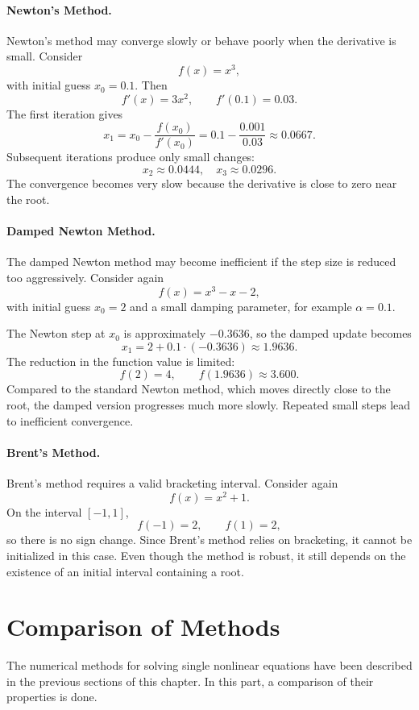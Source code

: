 \paragraph{Newton's Method.}
Newton's method may converge slowly or behave poorly when the derivative is small. Consider
\[
f(x) = x^3,
\]
with initial guess \(x_0 = 0.1\). Then
\[
f'(x) = 3x^2, \qquad f'(0.1) = 0.03.
\]
The first iteration gives
\[
x_1 = x_0 - \frac{f(x_0)}{f'(x_0)} = 0.1 - \frac{0.001}{0.03} \approx 0.0667.
\]
Subsequent iterations produce only small changes:
\[
x_2 \approx 0.0444, \quad x_3 \approx 0.0296.
\]
The convergence becomes very slow because the derivative is close to zero near the root.

\paragraph{Damped Newton Method.}
The damped Newton method may become inefficient if the step size is reduced too aggressively. Consider again
\[
f(x) = x^3 - x - 2,
\]
with initial guess \(x_0 = 2\) and a small damping parameter, for example \(\alpha = 0.1\).

The Newton step at \(x_0\) is approximately \(-0.3636\), so the damped update becomes
\[
x_1 = 2 + 0.1 \cdot (-0.3636) \approx 1.9636.
\]
The reduction in the function value is limited:
\[
f(2) = 4, \qquad f(1.9636) \approx 3.600.
\]
Compared to the standard Newton method, which moves directly close to the root, the damped version progresses much more slowly. Repeated small steps lead to inefficient convergence.

\paragraph{Brent's Method.}
Brent's method requires a valid bracketing interval. Consider again
\[
f(x) = x^2 + 1.
\]
On the interval \([-1, 1]\),
\[
f(-1) = 2, \qquad f(1) = 2,
\]
so there is no sign change. Since Brent's method relies on bracketing, it cannot be initialized in this case. Even though the method is robust, it still depends on the existence of an initial interval containing a root.

\section{Comparison of Methods}

The numerical methods for solving single nonlinear equations have been described in the previous sections of this chapter. In this part, a comparison of their properties is done.

